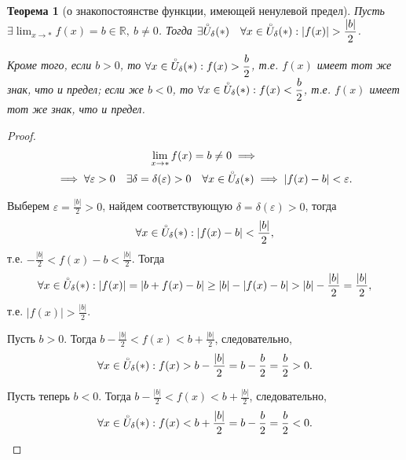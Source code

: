 \documentclass[a4paper,12pt]{article} %
\newtheorem{theorem}{Теорема}[section]
\theoremstyle{remark}
\theoremstyle{definition}
\begin{document}
\begin{theorem}[о знакопостоянстве функции, имеющей ненулевой предел]
	Пусть $\displaystyle \exists  \lim_{x \to *} f(x) = b\in \mathbb{R}, \ b \neq 0$. 
    Тогда $\displaystyle \exists \accentset{\circ}{U}_\delta(*)
    \quad \forall x \in \accentset{\circ}{U}_\delta(*) : |f(x)| > \frac{|b|}{2}$.

	Кроме того, если $b>0$, то  $\displaystyle \forall x \in \accentset{\circ}{U}_\delta(*) : f(x) > \frac{b}{2}$,
    т.е. $f(x)$ имеет тот же знак, что и предел;
	если же $b<0$, то $\displaystyle \forall x \in  \accentset{\circ}{U}_\delta(*) : f(x) < \frac{b}{2}$,
    т.е. $f(x)$ имеет тот же знак, что и предел.
\end{theorem}

\begin{proof}
    \begin{multline}
        \lim_{x \to *} f(x) = b \neq 0 \implies \\
        \implies \forall \varepsilon> 0 \quad \exists \delta=\delta(\varepsilon)>0 \quad \forall x\in 
        \accentset{\circ}{U}_\delta(*) \implies |f(x) - b| < \varepsilon.
    \end{multline}	

	Выберем $\displaystyle \varepsilon = \frac{|b|}{2} > 0$, найдем соответствующую $\delta = \delta(\varepsilon) > 0$,
    тогда 
    \[\forall x \in \accentset{\circ}{U}_\delta(*) : |f(x) - b| < \frac{|b|}{2},\] 
    т.е. $\displaystyle -\frac{|b|}{2} < f(x) - b < \frac{|b|}{2}$. Тогда
	\[ \forall x \in  \accentset{\circ}{U}_\delta(*) : |f(x)| = |b + f(x) - b| \ge  |b| - |f(x) - b| > |b| - \frac{|b|}{2}
    =\frac{|b|}{2},\] 
    т.е. $\displaystyle |f(x)| > \frac{|b|}{2}$.

    Пусть $b > 0$. Тогда $\displaystyle b - \frac{|b|}{2} < f(x) < b + \frac{|b|}{2}$, следовательно,
    \[\forall x\in \accentset{\circ}{U}_\delta(*) : f(x) > b - \frac{|b|}{2} = b - \frac{b}{2} = \frac{b}{2} > 0.\] 

    Пусть теперь $b < 0$. Тогда $\displaystyle b - \frac{|b|}{2} < f(x) < b + \frac{|b|}{2}$, следовательно,
    \[\forall x\in \accentset{\circ}{U}_\delta(*) : f(x) < b + \frac{|b|}{2} = b - \frac{b}{2} = \frac{b}{2} < 0.\] 
\end{proof}
\end{document}
